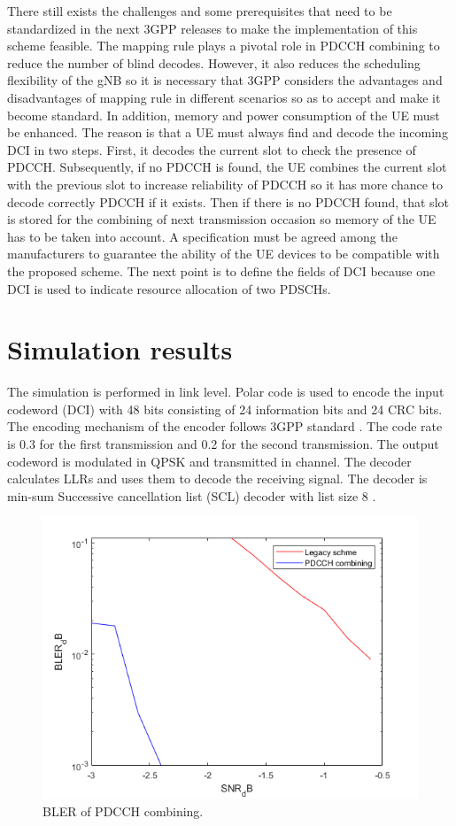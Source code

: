 \documentclass[conference]{IEEEtran}
\begin{document}
There still exists the challenges and some prerequisites that need to be standardized in the next 3GPP releases to make the implementation of this scheme feasible. The mapping rule plays a pivotal role in PDCCH combining to reduce the number of blind decodes. However, it also reduces the scheduling flexibility of the gNB so it is necessary that 3GPP considers the advantages and disadvantages of mapping rule in different scenarios so as to accept and make it become standard. In addition, memory and power consumption of the UE must be enhanced. The reason is that a UE must always find and decode the incoming DCI in two steps. First, it decodes the current slot to check the presence of PDCCH. Subsequently, if no PDCCH is found, the UE combines the current slot with the previous slot to increase reliability of PDCCH so it has more chance to decode correctly PDCCH if it exists. Then if there is no PDCCH found, that slot is stored for the combining of next transmission occasion so memory of the UE has to be taken into account. A specification must be agreed among the manufacturers to guarantee the ability of the UE devices to be compatible with the proposed scheme. The next point is to define the fields of DCI because one DCI is used to indicate resource allocation of two PDSCHs.  

\section{Simulation results}

The simulation is performed in link level. Polar code is used to encode the input codeword (DCI) with 48 bits consisting of 24 information bits and 24 CRC bits. The encoding mechanism of the encoder follows 3GPP standard \cite{b8}. The code rate is 0.3 for the first transmission and 0.2 for the second transmission. The output codeword is modulated in QPSK and transmitted in channel. The decoder calculates LLRs and uses them to decode the receiving signal. The decoder is min-sum Successive cancellation list (SCL) decoder with list size 8 \cite{b9}.

\begin{figure}[htbp]
\centerline{\includegraphics[scale=0.43]{fig8.png}}
\caption{BLER of PDCCH combining.}
\label{fig8}
\end{figure}
\end{document}
